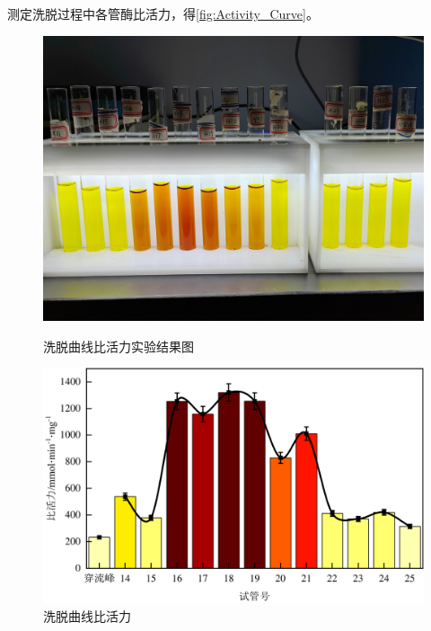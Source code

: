 测定洗脱过程中各管酶比活力，得\autoref{fig:Activity_Curve}。

\begin{figure}[H]
    \begin{minipage}[t]{0.47\textwidth}
    \includegraphics[width = \textwidth]{figure/1124/Activity_Curve.jpg}
    \caption{洗脱曲线比活力实验结果图}
    \label{fig:Activity_Curve_fig}
    \end{minipage}
    \begin{minipage}[t]{0.52\textwidth}
    \includegraphics[width = \textwidth]{figure/1124/Activity_Curve.pdf}
    \caption{洗脱曲线比活力}
    \label{fig:Activity_Curve}
    \end{minipage}
\end{figure}

